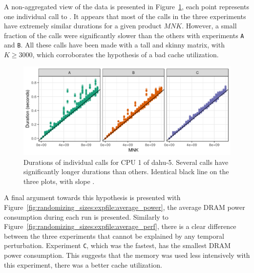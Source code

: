             A non-aggregated view of the data is presented in Figure~\ref{fig:randomizing_sizes:expfile:raw_data}, each
            point represents one individual call to \dgemm. It appears that most of the calls in the three experiments
            have extremely similar durations for a given product \(MNK\). However, a small fraction of the \dgemm calls
            were significantly slower than the others with experiments \texttt{A} and \texttt{B}. All these calls have
            been made with a tall and skinny matrix, with \(K\geq3000\), which corroborates the hypothesis of a bad
            cache utilization.

            \begin{figure}[htpb]
                \centering
                \includegraphics[width=\linewidth]{img/experiment/randomizing_sizes/expfile/raw_data.png}
                \caption{Durations of individual \dgemm calls for CPU 1 of dahu-5.
                Several calls have significantly longer durations than others. Identical black line on the three plots,
                with slope .}%
                \label{fig:randomizing_sizes:expfile:raw_data}
            \end{figure}

            A final argument towards this hypothesis is presented with
            Figure~\ref{fig:randomizing_sizes:expfile:average_power}, the average DRAM power consumption during each run
            is presented. Similarly to Figure~\ref{fig:randomizing_sizes:expfile:average_perf}, there is a clear
            difference between the three experiments that cannot be explained by any temporal perturbation. Experiment
            \texttt{C}, which was the fastest, has the smallest DRAM power consumption. This suggests that the memory
            was used less intensively with this experiment, \ie there was a better cache utilization.

